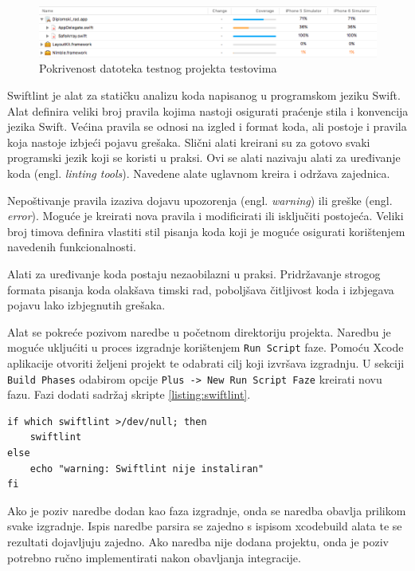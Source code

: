 \documentclass[times, utf8, diplomski, numeric]{fer}
\newcommand{\eng}[1]{(engl. \textit{#1})}
\begin{document}
\begin{figure}[h!]
\centering
\includegraphics[scale=0.45]{XcodeServerTestCoverage}
\caption{Pokrivenost datoteka testnog projekta testovima}
\label{fig:XcodeServerTestCoverage}
\end{figure}

Swiftlint je alat za statičku analizu koda napisanog u programskom jeziku Swift. Alat definira veliki broj pravila kojima nastoji osigurati praćenje stila i konvencija jezika Swift\citep{SwiftLint}. Većina pravila se odnosi na izgled i format koda, ali postoje i pravila koja nastoje izbjeći pojavu grešaka. Slični alati kreirani su za gotovo svaki programski jezik koji se koristi u praksi. Ovi se alati nazivaju alati za uređivanje koda \eng{linting tools}. Navedene alate uglavnom kreira i održava zajednica.

Nepoštivanje pravila izaziva dojavu upozorenja \eng{warning} ili greške \eng{error}. Moguće je kreirati nova pravila i modificirati ili isključiti postojeća. Veliki broj timova definira vlastiti stil pisanja koda koji je moguće osigurati korištenjem navedenih funkcionalnosti.

Alati za uređivanje koda postaju nezaobilazni u praksi. Pridržavanje strogog formata pisanja koda olakšava timski rad, poboljšava čitljivost koda i izbjegava pojavu lako izbjegnutih grešaka.

Alat se pokreće pozivom naredbe  u početnom direktoriju projekta. Naredbu je moguće ukljućiti u proces izgradnje korištenjem \verb|Run Script| faze. Pomoću Xcode aplikacije otvoriti željeni projekt te odabrati cilj koji izvršava izgradnju. U sekciji \verb|Build Phases| odabirom opcije \verb|Plus -> New Run Script Faze| kreirati novu fazu. Fazi dodati sadržaj skripte \ref{listing:swiftlint}.

\begin{lstlisting}[caption=Provjera postojanja i pokretanje Swiftlint alata, label=listing:swiftlint]
if which swiftlint >/dev/null; then
    swiftlint
else
    echo "warning: Swiftlint nije instaliran"
fi
\end{lstlisting}

Ako je poziv  naredbe dodan kao faza izgradnje, onda se naredba obavlja prilikom svake izgradnje. Ispis naredbe parsira se zajedno s ispisom xcodebuild alata te se rezultati dojavljuju zajedno. Ako naredba nije dodana projektu, onda je poziv potrebno ručno implementirati nakon obavljanja integracije.
\end{document}

